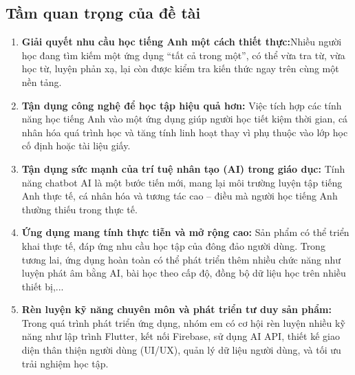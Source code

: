 \subsection{Tầm quan trọng của đề tài}
\begin{enumerate}
    \item \textbf{Giải quyết nhu cầu học tiếng Anh một cách thiết thực:}Nhiều người học đang tìm kiếm một ứng dụng “tất cả trong một”, có thể vừa tra từ, vừa học từ, luyện phản xạ, lại còn được kiểm tra kiến thức ngay trên cùng một nền tảng.
    
    \item \textbf{Tận dụng công nghệ để học tập hiệu quả hơn:} Việc tích hợp các tính năng học tiếng Anh vào một ứng dụng giúp người học tiết kiệm thời gian, cá nhân hóa quá trình học và tăng tính linh hoạt thay vì phụ thuộc vào lớp học cố định hoặc tài liệu giấy.
    
    \item \textbf{Tận dụng sức mạnh của trí tuệ nhân tạo (AI) trong giáo dục: }Tính năng chatbot AI là một bước tiến mới, mang lại môi trường luyện tập tiếng Anh thực tế, cá nhân hóa và tương tác cao – điều mà người học tiếng Anh thường thiếu trong thực tế.
    
    \item \textbf{Ứng dụng mang tính thực tiễn và mở rộng cao:} Sản phẩm có thể triển khai thực tế, đáp ứng nhu cầu học tập của đông đảo người dùng. Trong tương lai, ứng dụng hoàn toàn có thể phát triển thêm nhiều chức năng như luyện phát âm bằng AI, bài học theo cấp độ, đồng bộ dữ liệu học trên nhiều thiết bị,...
    
    \item \textbf{Rèn luyện kỹ năng chuyên môn và phát triển tư duy sản phẩm:} Trong quá trình phát triển ứng dụng, nhóm em có cơ hội rèn luyện nhiều kỹ năng như lập trình Flutter, kết nối Firebase, sử dụng AI API, thiết kế giao diện thân thiện người dùng (UI/UX), quản lý dữ liệu người dùng, và tối ưu trải nghiệm học tập.
\end{enumerate}

